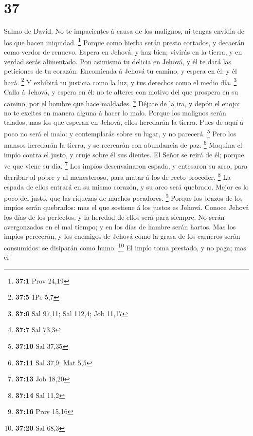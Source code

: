 \hypertarget{section-36}{%
\section{37}\label{section-36}}

 Salmo de David. No te impacientes á causa de los malignos,
ni tengas envidia de los que hacen iniquidad. \footnote{\textbf{37:1}
  Prov 24,19}  Porque como hierba serán presto cortados, y
decaerán como verdor de renuevo.  Espera en Jehová, y haz
bien; vivirás en la tierra, y en verdad serás alimentado. 
Pon asimismo tu delicia en Jehová, y él te dará las peticiones de tu
corazón.  Encomienda á Jehová tu camino, y espera en él; y
él hará. \footnote{\textbf{37:5} 1Pe 5,7}  Y exhibirá tu
justicia como la luz, y tus derechos como el medio día. \footnote{\textbf{37:6}
  Sal 97,11; Sal 112,4; Job 11,17}  Calla á Jehová, y espera
en él: no te alteres con motivo del que prospera en su camino, por el
hombre que hace maldades. \footnote{\textbf{37:7} Sal 73,3} 
Déjate de la ira, y depón el enojo: no te excites en manera alguna á
hacer lo malo.  Porque los malignos serán talados, mas los
que esperan en Jehová, ellos heredarán la tierra.  Pues de
aquí á poco no será el malo: y contemplarás sobre su lugar, y no
parecerá. \footnote{\textbf{37:10} Sal 37,35}  Pero los
mansos heredarán la tierra, y se recrearán con abundancia de paz.
\footnote{\textbf{37:11} Sal 37,9; Mat 5,5}  Maquina el
impío contra el justo, y cruje sobre él sus dientes.  El
Señor se reirá de él; porque ve que viene su día. \footnote{\textbf{37:13}
  Job 18,20}  Los impíos desenvainaron espada, y entesaron
su arco, para derribar al pobre y al menesteroso, para matar á los de
recto proceder. \footnote{\textbf{37:14} Sal 11,2}  La
espada de ellos entrará en su mismo corazón, y su arco será quebrado.
 Mejor es lo poco del justo, que las riquezas de muchos
pecadores. \footnote{\textbf{37:16} Prov 15,16}  Porque los
brazos de los impíos serán quebrados: mas el que sostiene á los justos
es Jehová.  Conoce Jehová los días de los perfectos: y la
heredad de ellos será para siempre.  No serán avergonzados
en el mal tiempo; y en los días de hambre serán hartos. 
Mas los impíos perecerán, y los enemigos de Jehová como la grasa de los
carneros serán consumidos: se disiparán como humo. \footnote{\textbf{37:20}
  Sal 68,3}  El impío toma prestado, y no paga; mas el
